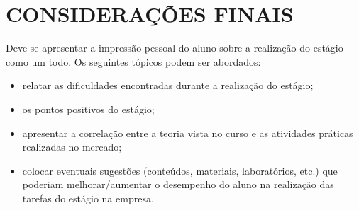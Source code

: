 
\chapter{CONSIDERAÇÕES FINAIS}
\label{chap:conclusao}

Deve-se apresentar a impressão pessoal do aluno sobre a realização do estágio como um todo. Os seguintes tópicos podem ser abordados:
\begin{itemize}
\item relatar as dificuldades encontradas durante a realização do estágio;
\item os pontos positivos do estágio;
\item apresentar a correlação entre a teoria vista no curso e as atividades práticas realizadas no mercado;
\item colocar eventuais sugestões (conteúdos, materiais, laboratórios, etc.) que poderiam melhorar/aumentar o desempenho do aluno na realização das tarefas do estágio na empresa.
\end{itemize}
